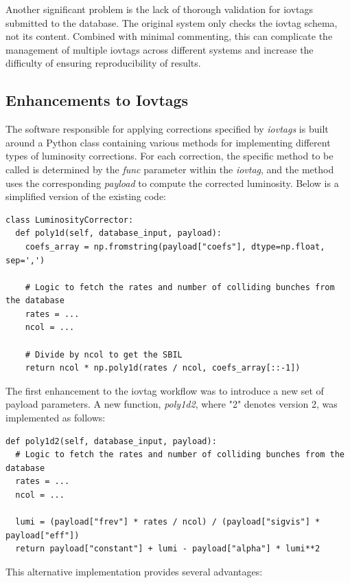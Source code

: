 Another significant problem is the lack of thorough validation for iovtags submitted to the database. The original system only checks the iovtag schema, not its content. Combined with minimal commenting, this can complicate the management of multiple iovtags across different systems and increase the difficulty of ensuring reproducibility of results.

\subsection{Enhancements to Iovtags}

The software responsible for applying corrections specified by \textit{iovtags} is built around a Python class containing various methods for implementing different types of luminosity corrections. For each correction, the specific method to be called is determined by the \textit{func} parameter within the \textit{iovtag}, and the method uses the corresponding \textit{payload} to compute the corrected luminosity. Below is a simplified version of the existing code:

\begin{lstlisting}
class LuminosityCorrector:
  def poly1d(self, database_input, payload):
    coefs_array = np.fromstring(payload["coefs"], dtype=np.float, sep=',')

    # Logic to fetch the rates and number of colliding bunches from the database
    rates = ...
    ncol = ...

    # Divide by ncol to get the SBIL
    return ncol * np.poly1d(rates / ncol, coefs_array[::-1])
\end{lstlisting}

The first enhancement to the iovtag workflow was to introduce a new set of payload parameters. A new function, \textit{poly1d2}, where "2" denotes version 2, was implemented as follows:

\begin{lstlisting}
def poly1d2(self, database_input, payload):
  # Logic to fetch the rates and number of colliding bunches from the database
  rates = ...
  ncol = ...

  lumi = (payload["frev"] * rates / ncol) / (payload["sigvis"] * payload["eff"])
  return payload["constant"] + lumi - payload["alpha"] * lumi**2
\end{lstlisting}

This alternative implementation provides several advantages:


